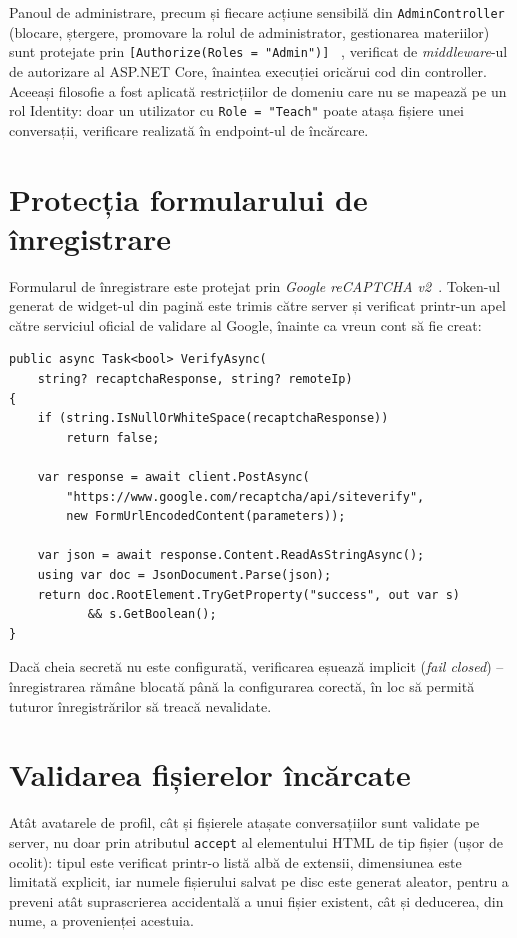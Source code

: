 Panoul de administrare, precum și fiecare acțiune sensibilă din
\texttt{AdminController} (blocare, ștergere, promovare la rolul de administrator,
gestionarea materiilor) sunt protejate prin \texttt{[Authorize(Roles = "Admin")]}
~\cite{identity-roles-docs}, verificat de \emph{middleware}-ul de autorizare al
ASP.NET Core, înaintea execuției oricărui cod din controller. Aceeași filosofie
a fost aplicată restricțiilor de domeniu care nu se mapează pe un rol Identity:
doar un utilizator cu \texttt{Role = "Teach"} poate atașa fișiere unei
conversații, verificare realizată în endpoint-ul de încărcare.

\section{Protecția formularului de înregistrare}

Formularul de înregistrare este protejat prin \emph{Google reCAPTCHA
v2}~\cite{recaptcha-docs}. Token-ul generat de widget-ul din pagină este trimis
către server și verificat printr-un apel către serviciul oficial de validare al
Google, înainte ca vreun cont să fie creat:

\begin{lstlisting}[caption={Verificarea token-ului reCAPTCHA (fragment)}]
public async Task<bool> VerifyAsync(
    string? recaptchaResponse, string? remoteIp)
{
    if (string.IsNullOrWhiteSpace(recaptchaResponse))
        return false;

    var response = await client.PostAsync(
        "https://www.google.com/recaptcha/api/siteverify",
        new FormUrlEncodedContent(parameters));

    var json = await response.Content.ReadAsStringAsync();
    using var doc = JsonDocument.Parse(json);
    return doc.RootElement.TryGetProperty("success", out var s)
           && s.GetBoolean();
}
\end{lstlisting}

Dacă cheia secretă nu este configurată, verificarea eșuează implicit (\emph{fail
closed}) -- înregistrarea rămâne blocată până la configurarea corectă, în loc să
permită tuturor înregistrărilor să treacă nevalidate.

\section{Validarea fișierelor încărcate}

Atât avatarele de profil, cât și fișierele atașate conversațiilor sunt validate
pe server, nu doar prin atributul \texttt{accept} al elementului HTML de tip
fișier (ușor de ocolit): tipul este verificat printr-o listă albă de extensii,
dimensiunea este limitată explicit, iar numele fișierului salvat pe disc este
generat aleator, pentru a preveni atât suprascrierea accidentală a unui fișier
existent, cât și deducerea, din nume, a provenienței acestuia.

